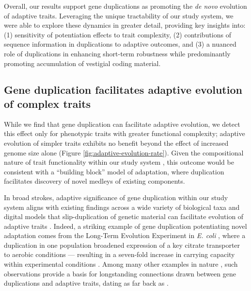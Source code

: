 Overall, our results support gene duplications as promoting the \textit{de novo} evolution of adaptive traits.
Leveraging the unique tractability of our study system, we were able to explore these dynamics in greater detail, providing key insights into:
(1) sensitivity of potentiation effects to trait complexity,
(2) contributions of sequence information in duplications to adaptive outcomes, and
(3) a nuanced role of duplications in enhancing short-term robustness while predominantly promoting accumulation of vestigial coding material.

\subsection{Gene duplication facilitates adaptive evolution of complex traits}

While we find that gene duplication can facilitate adaptive evolution, we detect this effect only for phenotypic traits with greater functional complexity; adaptive evolution of simpler traits exhibits no benefit beyond the effect of increased genome size alone (Figure \ref{fig:adaptive-evolution-rate}).
Given the compositional nature of trait functionality within our study system \citep{Lenski2003Evolutionary}, this outcome would be consistent with a ``building block'' model of adaptation, where duplication facilitates discovery of novel medleys of existing components.

In broad strokes, adaptive significance of gene duplication within our study system aligns with existing findings across a wide variety of biological taxa and digital models that slip-duplication of genetic material can facilitate evolution of adaptive traits \citep{Koza:1995fr,Zhang:2003fw,Teichmann:2004cz}.
Indeed, a striking example of gene duplication potentiating novel adaptation comes from the Long-Term Evolution Experiment in \textit{E. coli} \citep{lenski1991longterm,Lenski2003phenotypic}, where a duplication in one population broadened expression of a key citrate transporter to aerobic conditions --- resulting in a seven-fold increase in carrying capacity within experimental conditions \citep{blount_genomic_2012}.
Among many other examples in nature \citep{zhang2002adaptive,gaines2009gene,perry2007diet,hittinger2007gene,benderoth2006positive,dulai1999evolution,Ogino2015}, such observations provide a basis for longstanding connections drawn between gene duplications and adaptive traits, dating as far back as \citet{ohno1970evolution}.

